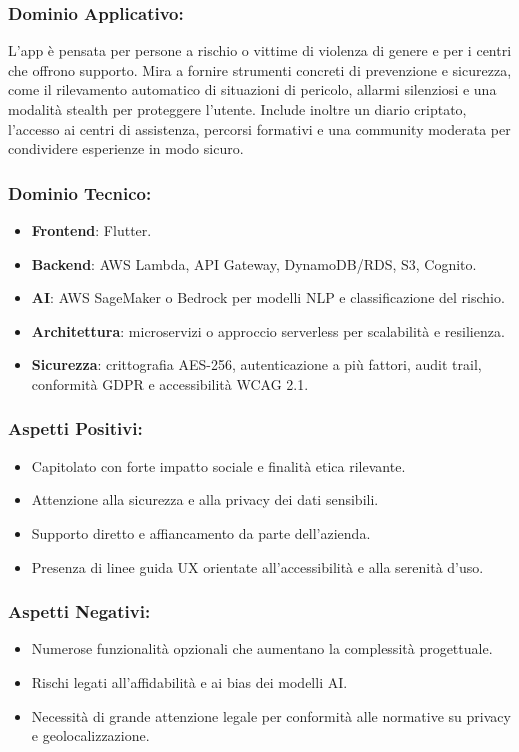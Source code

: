 \documentclass[a4paper,12pt]{article}
\begin{document}
\subsubsection*{Dominio Applicativo:}
L’app è pensata per persone a rischio o vittime di violenza di genere e per i centri che offrono supporto.  
Mira a fornire strumenti concreti di prevenzione e sicurezza, come il rilevamento automatico di situazioni di pericolo, allarmi silenziosi e una modalità stealth per proteggere l’utente.  
Include inoltre un diario criptato, l’accesso ai centri di assistenza, percorsi formativi e una community moderata per condividere esperienze in modo sicuro.


\subsubsection*{Dominio Tecnico:}
\begin{itemize}[leftmargin=*]
    \item \textbf{Frontend}: Flutter.
    \item \textbf{Backend}: AWS Lambda, API Gateway, DynamoDB/RDS, S3, Cognito.
    \item \textbf{AI}: AWS SageMaker o Bedrock per modelli NLP e classificazione del rischio.
    \item \textbf{Architettura}: microservizi o approccio serverless per scalabilità e resilienza.
    \item \textbf{Sicurezza}: crittografia AES-256, autenticazione a più fattori, audit trail, conformità GDPR e accessibilità WCAG 2.1.
\end{itemize}

\subsubsection*{Aspetti Positivi:}
\begin{itemize}[leftmargin=*]
    \item Capitolato con forte impatto sociale e finalità etica rilevante.
    \item Attenzione alla sicurezza e alla privacy dei dati sensibili.
    \item Supporto diretto e affiancamento da parte dell’azienda.
    \item Presenza di linee guida UX orientate all’accessibilità e alla serenità d’uso.
\end{itemize}

\subsubsection*{Aspetti Negativi:}
\begin{itemize}[leftmargin=*]
    \item Numerose funzionalità opzionali che aumentano la complessità progettuale.
    \item Rischi legati all’affidabilità e ai bias dei modelli AI.
    \item Necessità di grande attenzione legale per conformità alle normative su privacy e geolocalizzazione.
\end{itemize}
\end{document}
